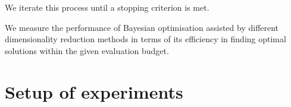 We iterate this process until a stopping criterion is met.



We measure the performance of Bayesian optimisation assisted by different dimensionality reduction methods in terms of its efficiency in finding optimal solutions within the given evaluation budget.

































































































\section{Setup of experiments}
\label{sec:ch04:exp_setup}





